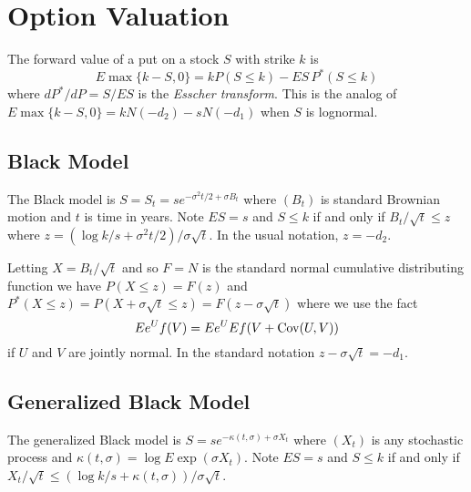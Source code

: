 \documentclass[11pt]{article}
\newcommand{\Cov}{\mathop{\rm{Cov}}}
\theoremstyle{remark}
\begin{document}
%

%

\section{Option Valuation}
The forward value of a put on a stock \(S\) with strike \(k\) is
\[
E\max\{k - S,0\} = k P(S \le k) - E S\,P^*(S \le k)
\]
where \(dP^*/dP = S/ES\) is the {\em Esscher transform}\cite{Ess1932}.
This is the analog of 
\(E\max\{k - S,0\} = kN(-d_2) - sN(-d_1)\)
when \(S\) is lognormal.

\subsection{Black Model}
The Black model is \(S = S_t = se^{-\sigma^2t/2 + \sigma B_t}\)
where \((B_t)\) is standard Brownian motion and \(t\) is time
in years. Note \(ES = s\) and \(S \le k\)
if and only if \(B_t/\sqrt{t} \le z\) where
\(z = (\log k/s + \sigma^2 t/2)/\sigma\sqrt{t}\). In the usual
notation, \(z = -d_2\).

Letting \(X = B_t/\sqrt{t}\) and so \(F = N\) is the standard
normal cumulative distributing function we have
\(P(X\le z) = F(z)\) and \(P^*(X\le z) = P(X + \sigma\sqrt{t} \le z)
= F(z - \sigma\sqrt{t})\) where we use the fact
\[
Ee^U f(V) = Ee^U Ef(V + \Cov(U,V))
\]
if \(U\) and \(V\) are
jointly normal. In the standard notation \(z - \sigma\sqrt{t} = -d_1\).

\subsection{Generalized Black Model}
The generalized Black model is \(S = se^{-\kappa(t,\sigma) + \sigma X_t}\)
where \((X_t)\) is any stochastic process and 
\(\kappa(t, \sigma) = \log E \exp(\sigma X_t)\). 
Note \(ES = s\) and \(S \le k\)
if and only if 
\(X_t/\sqrt{t} \le (\log k/s + \kappa(t,\sigma))/\sigma\sqrt{t}\).
\end{document}
